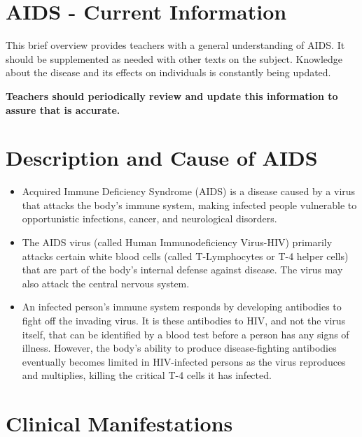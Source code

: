 \section{AIDS - Current Information}

This brief overview provides teachers with a general understanding of AIDS. It should be
supplemented as needed with other texts on the subject. Knowledge about the disease and
its effects on individuals is constantly being updated.

\noindent \textbf{Teachers should periodically review and update this information to assure that is
accurate.}

\section{Description and Cause of AIDS}

\begin{itemize}
\item Acquired Immune Deficiency Syndrome (AIDS) is a disease caused by a virus that
attacks the body's immune system, making infected people vulnerable to opportunistic
infections, cancer, and neurological disorders.
\item The AIDS virus (called Human Immunodeficiency Virus-HIV) primarily attacks certain
white blood cells (called T-Lymphocytes or T-4 helper cells) that are part of the body's
internal defense against disease. The virus may also attack the central nervous system.
\item An infected person's immune system responds by developing antibodies to fight off the
invading virus. It is these antibodies to HIV, and not the virus itself, that can be identified
by a blood test before a person has any signs of illness. However, the body's ability to
produce disease-fighting antibodies eventually becomes limited in HIV-infected persons as
the virus reproduces and multiplies, killing the critical T-4 cells it has infected.
\end{itemize}

\section{Clinical Manifestations}

